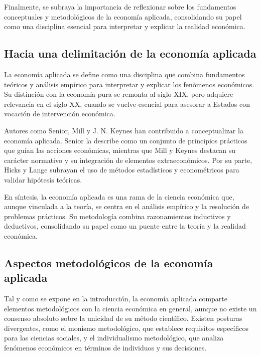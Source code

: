 \documentclass[12pt]{report} %
\begin{document}
Finalmente, se subraya la importancia de reflexionar sobre los
fundamentos conceptuales y metodológicos de la economía aplicada,
consolidando su papel como una disciplina esencial para interpretar y
explicar la realidad económica.

\hypertarget{hacia-una-delimitaciuxf3n-de-la-economuxeda-aplicada}{%
\subsection{Hacia una delimitación de la economía
aplicada}\label{hacia-una-delimitaciuxf3n-de-la-economuxeda-aplicada}}

La economía aplicada se define como una disciplina que combina
fundamentos teóricos y análisis empírico para interpretar y explicar los
fenómenos económicos. Su distinción con la economía pura se remonta al
siglo XIX, pero adquiere relevancia en el siglo XX, cuando se vuelve
esencial para asesorar a Estados con vocación de intervención económica.

Autores como Senior, Mill y J. N. Keynes han contribuido a
conceptualizar la economía aplicada. Senior la describe como un conjunto
de principios prácticos que guían las acciones económicas, mientras que
Mill y Keynes destacan su carácter normativo y su integración de
elementos extraeconómicos. Por su parte, Hicks y Lange subrayan el uso
de métodos estadísticos y econométricos para validar hipótesis teóricas.

En síntesis, la economía aplicada es una rama de la ciencia económica
que, aunque vinculada a la teoría, se centra en el análisis empírico y
la resolución de problemas prácticos. Su metodología combina
razonamientos inductivos y deductivos, consolidando su papel como un
puente entre la teoría y la realidad económica.

\hypertarget{aspectos-metodoluxf3gicos-de-la-economuxeda-aplicada}{%
\subsection{Aspectos metodológicos de la economía
aplicada}\label{aspectos-metodoluxf3gicos-de-la-economuxeda-aplicada}}

Tal y como se expone en la introducción, la economía aplicada comparte
elementos metodológicos con la ciencia económica en general, aunque no
existe un consenso absoluto sobre la unicidad de su método científico.
Existen posturas divergentes, como el monismo metodológico, que
establece requisitos específicos para las ciencias sociales, y el
individualismo metodológico, que analiza fenómenos económicos en
términos de individuos y sus decisiones.
\end{document}
